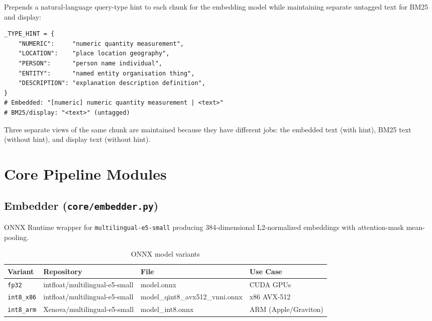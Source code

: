 \documentclass[12pt,a4paper]{article}
\begin{document}
Prepends a natural-language query-type hint to each chunk for the embedding model while maintaining separate untagged text for BM25 and display:

\begin{lstlisting}
_TYPE_HINT = {
    "NUMERIC":     "numeric quantity measurement",
    "LOCATION":    "place location geography",
    "PERSON":      "person name individual",
    "ENTITY":      "named entity organisation thing",
    "DESCRIPTION": "explanation description definition",
}
# Embedded: "[numeric] numeric quantity measurement | <text>"
# BM25/display: "<text>" (untagged)
\end{lstlisting}

\begin{notebox}
Three separate views of the same chunk are maintained because they have different jobs: the embedded text (with hint), BM25 text (without hint), and display text (without hint).
\end{notebox}


\section{Core Pipeline Modules}

\subsection{Embedder (\texttt{core/embedder.py})}

ONNX Runtime wrapper for \texttt{multilingual-e5-small} producing 384-dimensional L2-normalized embeddings with attention-mask mean-pooling.

\begin{table}[H]
\centering
\begin{tabular}{llll}
\toprule
\textbf{Variant} & \textbf{Repository} & \textbf{File} & \textbf{Use Case} \\
\midrule
\texttt{fp32}      & intfloat/multilingual-e5-small & model.onnx                    & CUDA GPUs \\
\texttt{int8\_x86} & intfloat/multilingual-e5-small & model\_qint8\_avx512\_vnni.onnx & x86 AVX-512 \\
\texttt{int8\_arm} & Xenova/multilingual-e5-small   & model\_int8.onnx               & ARM (Apple/Graviton) \\
\bottomrule
\end{tabular}
\caption{ONNX model variants}
\end{table}
\end{document}
